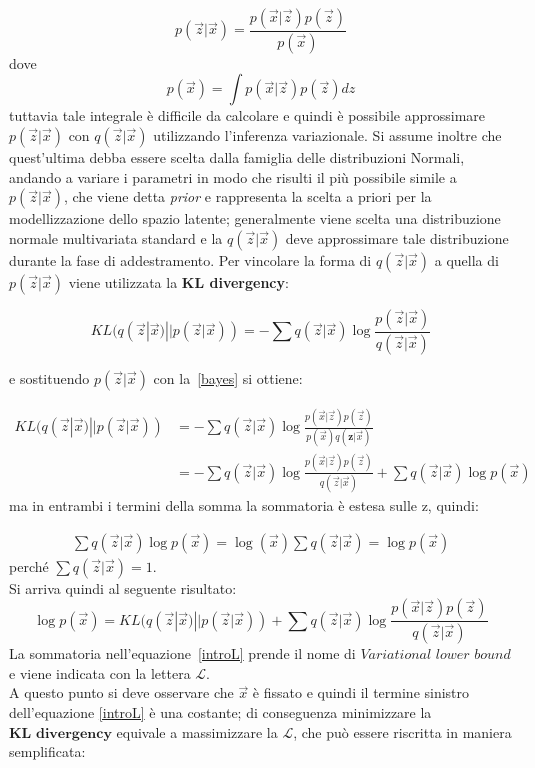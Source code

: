 \begin{equation}
	p(\vec{z}|\vec{x}) = \frac{p(\vec{x}|\vec{z}) p(\vec{z})}{p(\vec{x})}
	\label{bayes}
\end{equation}
dove
\begin{equation}
	p(\vec{x}) = \int p(\vec{x}|\vec{z}) p(\vec{z}) dz
	\label{integrale}
\end{equation}
tuttavia tale integrale è difficile da calcolare e quindi è possibile approssimare $p(\vec{z}|\vec{x})$ con $q(\vec{z}|\vec{x})$ utilizzando l'inferenza variazionale. Si assume inoltre che quest'ultima debba essere scelta dalla famiglia delle distribuzioni Normali, andando a variare i parametri in modo che risulti il più possibile simile a $p(\vec{z}|\vec{x})$, che viene detta \textit{prior} e rappresenta la scelta a priori per la modellizzazione dello spazio latente; generalmente viene scelta una distribuzione normale multivariata standard e la $q(\vec{z}|\vec{x})$ deve approssimare tale distribuzione durante la fase di addestramento. Per vincolare la forma di $q(\vec{z}|\vec{x})$ a quella di $p(\vec{z}|\vec{x})$ viene utilizzata la \textbf{KL divergency}: 


\begin{equation}
	KL (q(\vec{z}|\vec{x}) || p(\vec{z}|\vec{x})) = -\sum q(\vec{z}|\vec{x}) \log \frac{p(\vec{z}|\vec{x})}{q(\vec{z}|\vec{x})}
\end{equation}

e sostituendo $p(\vec{z}|\vec{x})$ con la~\ref{bayes} si ottiene:


\begin{align*} 
	KL (q(\vec{z}|\vec{x}) || p(\vec{z}|\vec{x})) &=  -\sum q(\vec{z}|\vec{x}) \log \frac{p(\vec{x}|\vec{z})p(\vec{z})}{p(\vec{x})q(\textbf{z}|\vec{x})} \\ &=  -\sum q(\vec{z}|\vec{x})\log \frac{p(\vec{x}|\vec{z})p(\vec{z})}{q(\vec{z}|\vec{x})} + \sum q(\vec{z}|\vec{x})\log p(\vec{x})
\end{align*}
ma in entrambi i termini della somma la sommatoria è estesa sulle z, quindi:

\begin{align*}
	\sum q(\vec{z}|\vec{x})\log p(\vec{x}) =
	\log (\vec{x}) \sum q(\vec{z}|\vec{x}) =
	\log p(\vec{x})
\end{align*}
perché $\sum q(\vec{z}|\vec{x})=1$. \\
Si arriva quindi al seguente risultato:
\begin{equation}
	\log p(\vec{x}) = KL (q(\vec{z}|\vec{x}) || p(\vec{z}|\vec{x})) + \sum q(\vec{z}|\vec{x}) \log \frac{p(\vec{x}|\vec{z})p(\vec{z})}{q(\vec{z}|\vec{x})}
	\label{introL}
\end{equation}
La sommatoria nell'equazione~\ref{introL} prende il nome di $\textit{Variational lower bound}$ e viene indicata con la lettera $\mathcal{L}$. \\
A questo punto si deve osservare che $\vec{x}$ è fissato e quindi il termine sinistro dell'equazione \ref{introL} è una costante; di conseguenza minimizzare la $\textbf{KL divergency}$ equivale a massimizzare la $\mathcal{L}$, che può essere riscritta in maniera semplificata:

